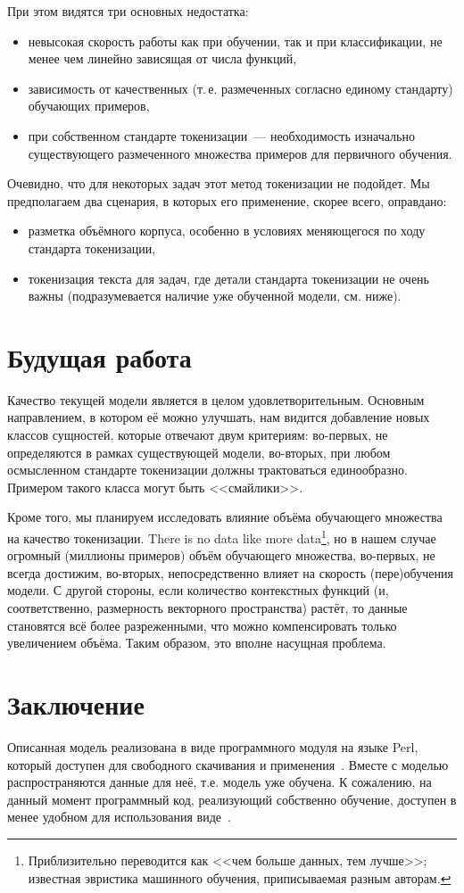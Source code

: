 \documentclass[a4paper]{article}
\begin{document}
При этом видятся три основных недостатка:
\begin{itemize}
\item невысокая скорость работы как при обучении, так и при классификации, не менее чем линейно зависящая от числа функций,
\item зависимость от качественных (т.\,е. размеченных согласно единому стандарту) обучающих примеров,
\item при собственном стандарте токенизации~--- необходимость изначально существующего размеченного множества примеров для первичного обучения.
\end{itemize}

Очевидно, что для некоторых задач этот метод токенизации не подойдет. Мы предполагаем два сценария, в которых его применение, скорее всего, оправдано:
\begin{itemize}
\item разметка объёмного корпуса, особенно в условиях меняющегося по ходу стандарта токенизации,
\item токенизация текста для задач, где детали стандарта токенизации не очень важны (подразумевается наличие уже обученной модели, см. ниже).
\end{itemize}
\section{Будущая работа}
Качество текущей модели является в целом удовлетворительным. Основным направлением, в котором её можно улучшать, нам видится добавление новых классов сущностей, которые отвечают двум критериям: во-первых, не определяются в рамках существующей модели, во-вторых, при любом осмысленном стандарте токенизации должны трактоваться единообразно. Примером такого класса могут быть <<смайлики>>.

Кроме того, мы планируем исследовать влияние объёма обучающего множества на качество токенизации. There is no data like more data\footnote{Приблизительно переводится как <<чем больше данных, тем лучше>>; известная эвристика машинного обучения, приписываемая разным авторам.}, но в нашем случае огромный (миллионы примеров) объём обучающего множества, во-первых, не всегда достижим, во-вторых, непосредственно влияет на скорость (пере)обучения модели. С другой стороны, если количество контекстных функций (и, соответственно, размерность векторного пространства) растёт, то данные становятся всё более разреженными, что можно компенсировать только увеличением объёма. Таким образом, это вполне насущная проблема.
\section{Заключение}
Описанная модель реализована в виде программного модуля на языке Perl, который доступен для свободного скачивания и применения~\cite{opcorpora_perltok}. Вместе с моделью распространяются данные для неё, т.е. модель уже обучена. К сожалению, на данный момент программный код, реализующий собственно обучение, доступен в менее удобном для использования виде~\cite{opcorpora_tok_code}.


\end{document}
